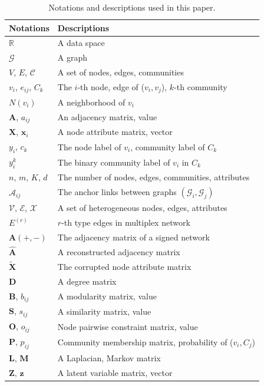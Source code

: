 \begin{table}[!t]
\centering \footnotesize
\renewcommand\arraystretch{1}
\setlength{\tabcolsep}{3mm}
\caption{Notations and descriptions used in this paper.}
\begin{tabular}{l|l}
\toprule[1pt]
\textbf{Notations} & \textbf{Descriptions }\\ \midrule
$\mathbb{R}$ & A data space \\ \hline
$\mathcal{G}$ & A graph \\
$V$, $E$, $\mathcal{C}$ & A set of nodes, edges, communities \\
$v_i$, $e_{ij}$, $C_k$ & The $i$-th node, edge of ($v_i,v_j$), $k$-th community \\
$N(v_i)$ & A neighborhood of $v_i$ \\
$\bm{A}$, $a_{ij}$ & An adjacency matrix, value \\
$\bm{X}$, $\bm{x}_i$ & A node attribute matrix, vector \\ 
$y_i$, $c_k$ & The node label of $v_i$, community label of $C_k$ \\
$y^k_i$ & The binary community label of $v_i$ in $C_k$ \\
$n$, $m$, $K$, $d$ & The number of nodes, edges, communities, attributes \\ \hline
$\mathcal{A}_{ij}$ & The anchor links between graphs $(\mathcal{G}_i,\mathcal{G}_j)$  \\
$\mathcal{V}$, $\mathcal{E}$, $\mathcal{X}$ & A set of heterogeneous nodes, edges, attributes \\ 
$E^{(r)}$ & $r$-th type edges in multiplex network \\
$\bm{A}(+,-)$ & The adjacency matrix of a signed network \\
$\hat{\bm{A}}$ & A reconstructed adjacency matrix\\
$\widetilde{\bm{X}}$ & The corrupted node attribute matrix \\ \hline
$\bm{D}$ & A degree matrix \\
$\bm{B}$, $b_{ij}$ & A modularity matrix, value \\
$\bm{S}$, $s_{ij}$ & A similarity matrix, value \\
$\bm{O}$, $o_{ij}$ & Node pairwise constraint matrix, value \\
$\bm{P}$, $p_{ij}$ & Community membership matrix, probability of ($v_i,C_j$) \\
$\bm{L}$, $\bm{M}$ & A Laplacian, Markov matrix \\
$\bm{Z}$, $\bm{z}$ & A latent variable matrix, vector \\

\end{tabular}
\end{table}
